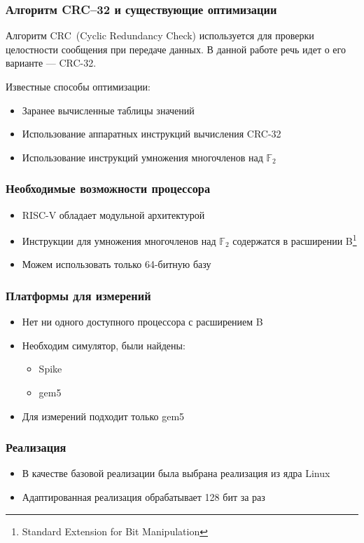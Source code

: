 \documentclass[aspectratio=169]{beamer}
\begin{document}
\begin{frame}
  \frametitle{Алгоритм CRC--32 и существующие оптимизации}
  Алгоритм CRC~(Cyclic Redundancy Check) используется для проверки целостности сообщения при передаче данных.
  В данной работе речь идет о его варианте --- CRC-32.

  Известные способы оптимизации:
  \begin{itemize}
    \item Заранее вычисленные таблицы значений
    \item Использование аппаратных инструкций вычисления CRC-32
    \item Использование инструкций умножения многочленов над $\mathbb{F}_2$
  \end{itemize}
\end{frame}


\begin{frame}
  \frametitle{Необходимые возможности процессора}
  \begin{itemize}
    \item RISC-V обладает модульной архитектурой
    \item Инструкции для умножения многочленов над $\mathbb{F}_2$ содержатся в расширении B\footnote{Standard Extension for Bit Manipulation}
    \item Можем использовать только 64-битную базу
  \end{itemize}
\end{frame}


\begin{frame}
  \frametitle{Платформы для измерений}
  \begin{itemize}
    \item Нет ни одного доступного процессора с расширением B
    \item Необходим симулятор, были найдены:
          \begin{itemize}
            \item Spike
            \item gem5
          \end{itemize}
    \item Для измерений подходит только gem5
  \end{itemize}
\end{frame}

\begin{frame}
  \frametitle{Реализация}
  \begin{itemize}
    \item В качестве базовой реализации была выбрана реализация из ядра Linux
    \item Адаптированная реализация обрабатывает 128 бит за раз
  \end{itemize}
\end{frame}
\end{document}
